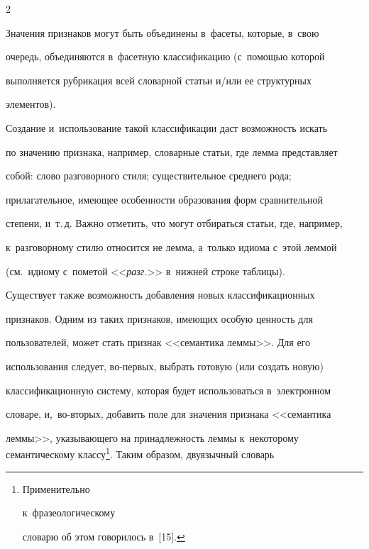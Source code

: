 \begin{multicols}{2}
{





}


  


  Значения признаков могут быть объединены в~фасеты, которые, в~свою 


очередь, объединяются в~фасетную классификацию (с~по\-мощью которой 


выполняется рубрикация всей словарной статьи и/или ее структурных 


элементов).


  


  Создание и~использование такой классификации даст возможность искать 


по значению признака, например, словарные статьи, где лемма пред\-став\-ля\-ет 


собой: слово разговорного стиля; \mbox{существительное} среднего рода; 


прилагательное, име\-ющее особенности образования форм сравнительной 


степени, и~т.\,д. Важно отметить, что могут отбираться статьи, где, например, 


к~разговорному стилю относится не лемма, а~только идиома с~этой леммой 


(см.\ идиому с~пометой <<\textit{разг.}>> в~нижней строке таблицы).


  


  Существует также возможность добавления новых классификационных 


признаков. Одним из таких признаков, имеющих особую ценность для 


пользователей, может стать признак <<семантика леммы>>. Для его 


использования следует, во-пер\-вых, выбрать готовую (или создать новую) 


классификационную систему, которая будет использоваться в~электронном 


словаре, и,~во-вто\-рых, добавить поле для значения признака <<семантика 


леммы>>, ука\-зы\-ва\-юще\-го на принадлежность леммы к~некоторому семантическому классу\footnote{Применительно 


к~фразеологическому 


словарю об этом говорилось в~[15].}. Таким образом, двуязычный словарь 



\end{multicols}
